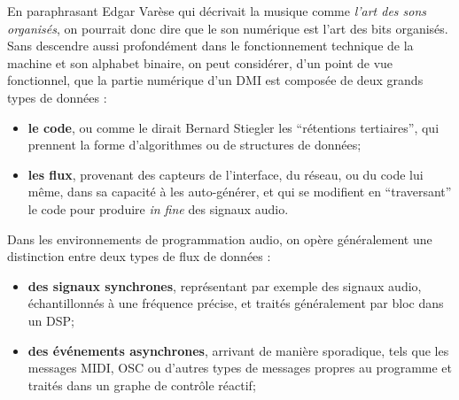 \noindent En paraphrasant Edgar Varèse qui décrivait la musique comme \textit{l'art des sons organisés}, on pourrait donc dire que le son numérique est l'art des bits organisés. Sans descendre aussi profondément dans le fonctionnement technique de la machine et son alphabet binaire, on peut considérer, d'un point de vue fonctionnel, que la partie numérique d'un \gls{DMI} est composée de deux grands types de données :
\vspace{-1em}
\begin{itemize}[noitemsep]
	\item \textbf{le code}, ou comme le dirait Bernard Stiegler les ``rétentions tertiaires'', qui prennent la forme d'algorithmes ou de structures de données;
	\item \textbf{les flux}, provenant des capteurs de l'interface, du réseau, ou du code lui même, dans sa capacité à les auto-générer, et qui se modifient en ``traversant'' le code pour produire \textit{in fine} des signaux audio.
\end{itemize}
\noindent Dans les environnements de programmation audio, on opère généralement une distinction entre deux types de flux de données : 
\vspace{-1em}
\begin{itemize}[noitemsep]
	\item \textbf{des signaux synchrones}, représentant par exemple des signaux audio, échantillonnés à une fréquence précise, et traités généralement par bloc dans un \gls{DSP};
	\item \textbf{des événements asynchrones}, arrivant de manière sporadique, tels que les messages \gls{MIDI}, \gls{OSC} ou d'autres types de messages propres au programme et traités dans un graphe de contrôle réactif;
\end{itemize}

